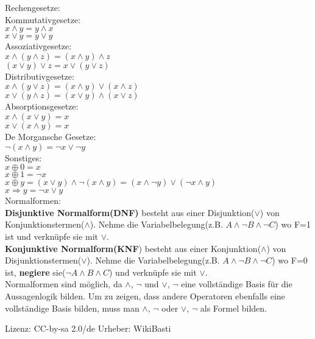 \documentclass[11pt]{article}
\begin{document}
Rechengesetze:\\
Kommutativgesetze:\\ $x \land y = y \land x$ \\ $x \lor y = y \lor y$ \\
Assoziativgesetze: \\ $x \land ( y \land z ) = ( x \land y ) \land z $ \\ $( x \lor y ) \lor z = x \lor( y \lor z )$ \\
Distributivgesetze: \\ $x \land ( y \lor z ) = ( x \land y ) \lor ( x \land z )$ \\  	$x \lor ( y \land z ) = ( x \lor y ) \land ( x \lor z )$ \\
Absorptionsgesetze: \\ $x \land ( x \lor y ) = x$ \\ $x \lor ( x \land y ) = x$\\
De Morgansche Gesetze: \\ $\neg ( x \land y ) = \neg x \lor \neg y$ \\
Sonstiges: \\ $x \oplus 0 = x$\\ $x \oplus 1 = \neg x$ \\ $ x \oplus y = (x \lor y) \land \neg ( x \land y ) = ( x \land \neg y ) \lor ( \neg x \land y )$ \\ $ x \Rightarrow y = \neg x \lor y $ \\
Normalformen:\\
{\bfseries Disjunktive Normalform(DNF)} besteht aus einer Disjunktion($\lor$) von Konjunktionstermen($\land$). Nehme die Variabelbelegung(z.B. $A \land \neg B \land \neg C$) wo F=1 ist und verkn{\"u}pfe sie mit $\lor$. \\
{\bfseries Konjunktive Normalform(KNF}) besteht aus einer Konjunktion($\land$) von Disjunktionstermen($\lor$). Nehme die Variabelbelegung(z.B. $A \land \neg B \land \neg C$) wo F=0 ist, {\bfseries negiere} sie($\neg A \land B \land C$) und verkn{\"u}pfe sie mit $\lor$. \\
Normalformen sind m{\"o}glich, da $\land$, $\neg$ und $\lor$, $\neg$ eine vollst{\"a}ndige Basis f{\"u}r die Aussagenlogik bilden. Um zu zeigen, dass andere Operatoren ebenfalls eine vollst{\"a}ndige Basis bilden, muss man $\land$, $\neg$ oder $\lor$, $\neg$ als Formel bilden. \\
\begin{figure}[H]
  \centering
  \def\svgwidth{400pt}
	\end{figure}\scriptsize  Lizenz: CC-by-sa 2.0{/}de Urheber: WikiBasti\normalsize \\
\end{document}
